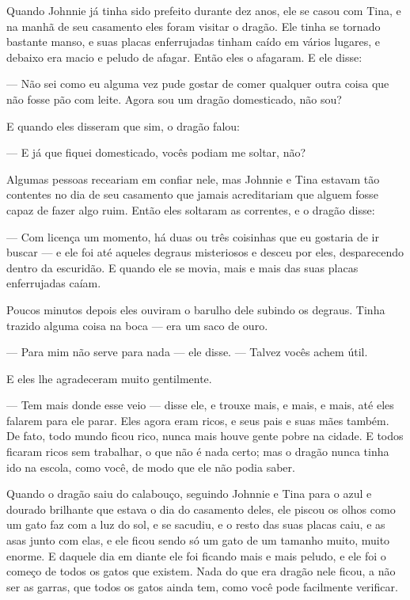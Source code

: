 Quando Johnnie já tinha sido prefeito durante dez anos, ele se casou
com Tina, e na manhã de seu casamento eles foram visitar o dragão.
Ele tinha se tornado bastante manso, e suas placas enferrujadas
tinham caído em vários lugares, e debaixo era macio e peludo de
afagar. Então eles o afagaram. E ele disse:

— Não sei como eu alguma vez pude gostar de comer qualquer outra coisa
que não fosse pão com leite. Agora sou um dragão domesticado, não
sou?

 E quando eles disseram que sim, o dragão falou:

— E já que fiquei domesticado, vocês podiam me soltar, não?

Algumas pessoas receariam em confiar nele, mas Johnnie e Tina estavam
tão contentes no dia de seu casamento que jamais acreditariam que
alguem fosse capaz de fazer algo ruim. Então eles soltaram as
correntes, e o dragão disse:

— Com licença um momento, há duas ou três coisinhas que eu gostaria de
ir buscar — e ele foi até aqueles degraus misteriosos e desceu por
eles, desparecendo dentro da escuridão. E quando ele se movia, mais e
mais das suas placas enferrujadas caíam.

Poucos minutos depois eles ouviram o barulho dele subindo os degraus.
Tinha trazido alguma coisa na boca — era um saco de ouro.

— Para mim não serve para nada — ele disse. — Talvez vocês achem útil.

E eles lhe agradeceram muito gentilmente.

— Tem mais donde esse veio — disse ele, e trouxe mais, e mais, e mais,
até eles falarem para ele parar. Eles agora eram ricos, e seus pais e
suas mães também. De fato, todo mundo ficou rico, nunca mais houve
gente pobre na cidade. E todos ficaram ricos sem trabalhar, o que não
é nada certo; mas o dragão nunca tinha ido na escola, como você, de
modo que ele não podia saber.

Quando o dragão saiu do calabouço, seguindo Johnnie e Tina para o azul
e dourado brilhante que estava o dia do casamento deles, ele piscou
os olhos como um gato faz com a luz do sol, e se sacudiu, e o resto
das suas placas caiu, e as asas junto com elas, e ele ficou sendo só
um gato de um tamanho muito, muito enorme. E daquele dia em diante
ele foi ficando mais e mais peludo, e ele foi o começo de todos os
gatos que existem. Nada do que era dragão nele ficou, a não ser as
garras, que todos os gatos ainda tem, como você pode facilmente
verificar.

